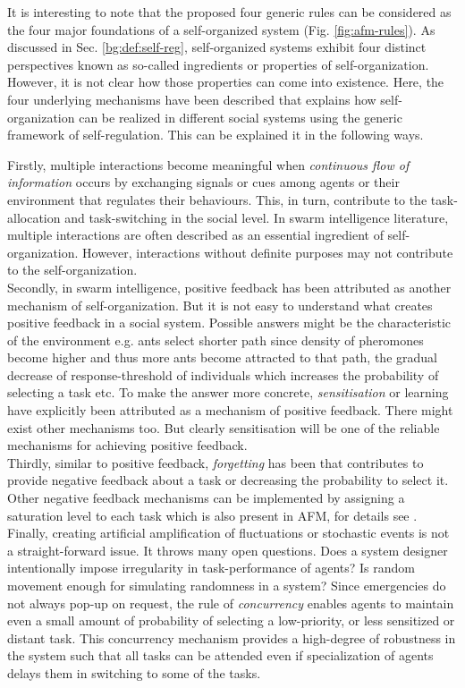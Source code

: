 It is interesting to note that the proposed four generic rules can be considered as  the four major foundations of a self-organized system (Fig.  \ref{fig:afm-rules}). As discussed in Sec. \ref{bg:def:self-reg},  self-organized systems exhibit four distinct perspectives known as so-called ingredients or properties of self-organization. However, it is not clear how those properties can come into existence. Here, the four underlying mechanisms have been described that explains how self-organization can be realized in different social systems using the generic framework of self-regulation. This can be explained it in the following ways.

Firstly, multiple interactions become meaningful when {\em continuous flow of information} occurs  by exchanging signals or cues among agents or their environment  that regulates their behaviours. This, in turn, contribute to the task-allocation  and task-switching in the social level.  In swarm intelligence literature, multiple interactions are often described as an essential ingredient of self-organization. However, interactions without definite purposes may not contribute to the self-organization.\\
Secondly, in swarm intelligence, positive feedback has been attributed as another mechanism of  self-organization. But it is not easy to understand what creates positive feedback in a social system. Possible answers might be the characteristic of the environment e.g. ants select shorter path since density of pheromones become higher and thus more ants become attracted to that path, the gradual decrease of response-threshold of individuals which increases the probability of selecting a task etc.  To make the answer more concrete, {\em sensitisation} or learning have explicitly been attributed as a mechanism of positive feedback. There might exist other mechanisms too. But clearly sensitisation will be one of the reliable mechanisms for achieving positive feedback.\\
Thirdly, similar to positive feedback,  {\em forgetting} has been that contributes to provide negative feedback about a task or decreasing the probability to select it. Other negative feedback mechanisms can be implemented by assigning a saturation level to each task which is also present in AFM, for details see .\\
Finally, creating  artificial amplification of fluctuations or stochastic events is not a straight-forward issue. It throws  many open questions. Does a system designer intentionally impose irregularity in task-performance of agents?  Is random movement  enough for simulating randomness in a system?
Since emergencies do not always pop-up on request, the rule of {\em concurrency} enables agents to  maintain even a small amount of probability of selecting a low-priority, or less sensitized or distant task. This concurrency mechanism provides a high-degree of robustness in the system such that all tasks can be attended even if specialization of agents delays them in switching to some of the tasks.
